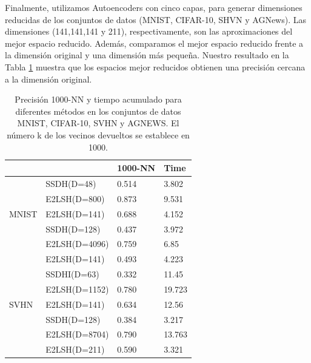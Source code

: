 Finalmente, utilizamos Autoencoders con cinco capas, para generar dimensiones reducidas de los conjuntos de datos (MNIST, CIFAR-10, SHVN y AGNews). Las dimensiones (141,141,141 y 211), respectivamente, son las aproximaciones del mejor espacio reducido. Además, comparamos el mejor espacio reducido frente a la dimensión original y una dimensión más pequeña. Nuestro resultado en la Tabla \ref{table:section4_presicion1000} muestra que los espacios mejor reducidos obtienen una precisión cercana a la dimensión original.

\begin{table}[!h]
\centering
\caption{Precisión 1000-NN y tiempo acumulado para diferentes métodos en los conjuntos de datos MNIST, CIFAR-10, SVHN y AGNEWS. El número k de los vecinos devueltos se establece en 1000.}
\label{table:section4_presicion1000}
\begin{tabular}{l|l|l|l|}
\cline{2-4}
                                                                        &               & 1000-NN & Time  \\ \hline
\multicolumn{1}{|l|}{}                                                  & SSDH(D=48)    & 0.514   & 3.802 \\ \cline{2-4} 
\multicolumn{1}{|l|}{}                                                  & E2LSH(D=800)  & 0.873   & 9.531  \\ \cline{2-4} 
\multicolumn{1}{|l|}{\multirow{-3}{*}{MNIST}}                           & E2LSH(D=141)  & 0.688   & 4.152 \\ \hline
\rowcolor[HTML]{EFEFEF} 
\multicolumn{1}{|l|}{\cellcolor[HTML]{EFEFEF}}                          & SSDH(D=128)   & 0.437   & 3.972 \\ \cline{2-4} 
\rowcolor[HTML]{EFEFEF} 
\multicolumn{1}{|l|}{\cellcolor[HTML]{EFEFEF}}                          & E2LSH(D=4096) & 0.759   & 6.85 \\ \cline{2-4} 
\rowcolor[HTML]{EFEFEF} 
\multicolumn{1}{|l|}{\multirow{-3}{*}{\cellcolor[HTML]{EFEFEF}CIFAR10}} & E2LSH(D=141)  & 0.493   & 4.223 \\ \hline
\multicolumn{1}{|l|}{}                                                  & SSDHI(D=63)   & 0.332   & 11.45 \\ \cline{2-4} 
\multicolumn{1}{|l|}{}                                                  & E2LSH(D=1152) & 0.780   & 19.723  \\ \cline{2-4} 
\multicolumn{1}{|l|}{\multirow{-3}{*}{SVHN}}                            & E2LSH(D=141)  & 0.634   & 12.56 \\ \hline
\rowcolor[HTML]{EFEFEF} 
\multicolumn{1}{|l|}{\cellcolor[HTML]{EFEFEF}}                          & SSDH(D=128)   & 0.384   & 3.217 \\ \cline{2-4} 
\rowcolor[HTML]{EFEFEF} 
\multicolumn{1}{|l|}{\cellcolor[HTML]{EFEFEF}}                          & E2LSH(D=8704) & 0.790   & 13.763 \\ \cline{2-4} 
\rowcolor[HTML]{EFEFEF} 
\multicolumn{1}{|l|}{\multirow{-3}{*}{\cellcolor[HTML]{EFEFEF}AGNEWS}}  & E2LSH(D=211)  & 0.590   & 3.321 \\ \hline
\end{tabular}
\end{table}

